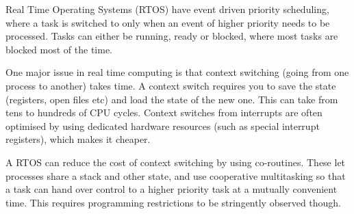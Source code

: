 Real Time Operating Systems (RTOS) have event driven priority scheduling, where
a task is switched to only when an event of higher priority needs to be
processed. Tasks can either be running, ready or blocked, where most tasks are
blocked most of the time.

One major issue in real time computing is that context switching (going from one
process to another) takes time. A context switch requires you to save the state
(registers, open files etc) and load the state of the new one. This can take
from tens to hundreds of CPU cycles. Context switches from interrupts are often
optimised by using dedicated hardware resources (such as special interrupt
registers), which makes it cheaper.

A RTOS can reduce the cost of context switching by using co-routines. These let
processes share a stack and other state, and use cooperative multitasking so
that a task can hand over control to a higher priority task at a mutually
convenient time. This requires programming restrictions to be stringently
observed though.
